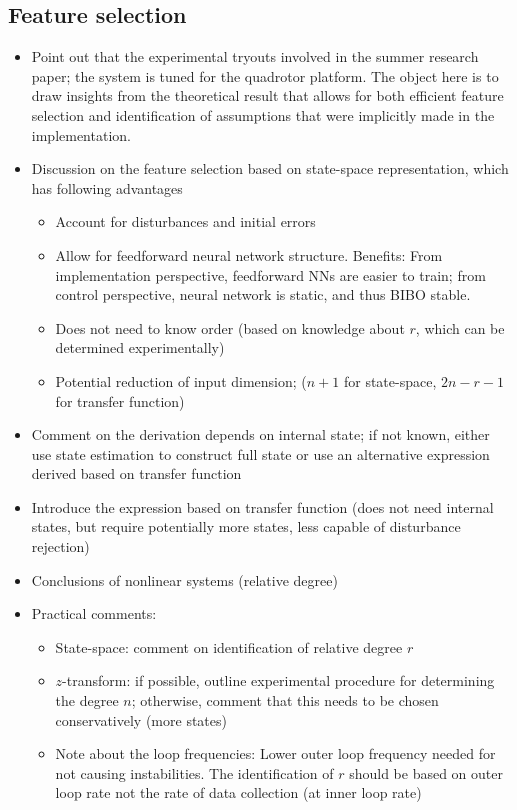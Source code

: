 \subsection{Feature selection}
\begin{itemize}
\color{grey1}
\item Point out that the experimental tryouts involved in the summer research paper; the system is tuned for the quadrotor platform. The object here is to draw insights from the theoretical result that allows for both efficient feature selection and identification of assumptions that were implicitly made in the implementation.
\item Discussion on the feature selection based on state-space representation, which has following advantages
\begin{itemize}
\item Account for disturbances and initial errors
\item Allow for feedforward neural network structure. Benefits: From implementation perspective, feedforward NNs are easier to train; from control perspective, neural network is static, and thus BIBO stable.
\item Does not need to know order (based on knowledge about $r$, which can be determined experimentally)
\item Potential reduction of input dimension; ($n+1$ for state-space, $2n-r-1$ for transfer function)
\end{itemize}
\item Comment on the derivation depends on internal state; if not known, either use state estimation to construct full state or use an alternative expression derived based on transfer function
\item Introduce the expression based on transfer function (does not need internal states, but require potentially more states, less capable of disturbance rejection)
\item Conclusions of nonlinear systems (relative degree)
\item Practical comments:
\begin{itemize}
\item State-space: comment on identification of relative degree $r$
\item $z$-transform: if possible, outline experimental procedure for determining the degree $n$; otherwise, comment that this needs to be chosen conservatively (more states)
\item Note about the loop frequencies: Lower outer loop frequency needed for not causing instabilities. The identification of $r$ should be based on outer loop rate not the rate of data collection (at inner loop rate)
\end{itemize}
\end{itemize}

